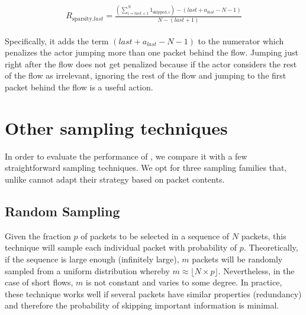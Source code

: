 \documentclass[conference]{IEEEtran}
\begin{document}
\begin{align}
\begin{split}
R_{\text{sparsity},\textit{last}} = \frac{\left(\sum_{i=\textit{last}+1}^{N} 1_{\text{skipped},i}\right) - \left(\textit{last}+a_{\textit{last}} - N - 1\right)}{N- (\textit{last}+1)}
\end{split}
\label{eq:R_sparsity_last}
\end{align}

Specifically, it adds the term $\left(\textit{last}+a_{\textit{last}} - N - 1\right)$ to the numerator which penalizes the actor jumping more than one packet behind the flow. Jumping just right after the flow does not get penalized because if the actor considers the rest of the flow as irrelevant, ignoring the rest of the flow and jumping to the first packet behind the flow is a useful action.

\section{Other sampling techniques}
\label{sec:other_sampling_techniques}
In order to evaluate the performance of \ours, we compare it with a few straightforward sampling techniques.
We opt for three sampling families that, unlike \ours{} cannot adapt their strategy based on packet contents. %

\subsection{Random Sampling}

Given the fraction $p$ of packets to be selected in a sequence of $N$ packets, this technique will sample each individual packet with probability of $p$. Theoretically, if the sequence is large enough (infinitely large), $m$ packets will be randomly sampled from a uniform distribution whereby $m \approx \lfloor N \times p \rfloor$. Nevertheless, in the case of short flows, $m$ is not constant and varies to some degree.  In practice, these technique works well if several packets have similar properties (redundancy) and therefore the probability of skipping important information is minimal.
\end{document}
